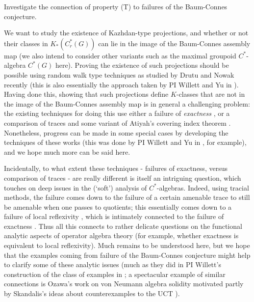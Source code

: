 \begin{project}
Investigate the connection of property (T) to failures of the Baum-Connes conjecture.
\end{project}

We want to study the existence of Kazhdan-type projections, and whether or not their classes in $K_*(C^*_r(G))$ can lie in the image of the Baum-Connes assembly map (we also intend to consider other variants such as the maximal groupoid $C^*$-algebra $C^*(G)$ here).   Proving the existence of such projections should be possible using random walk type techniques as studied by Drutu and Nowak recently \cite{Drutu:2015aa} (this is also essentially the approach taken by PI Willett and Yu in \cite{Willett:2013cr}).  Having done this, showing that such projections define $K$-classes that are not in the image of the Baum-Connes assembly map is in general a challenging problem: the existing techniques for doing this use either a failure of \emph{exactness} \cite{Higson:2002la}, or a comparison of traces and some variant of Atiyah's covering index theorem \cite{Higson:1999km}.  Nonetheless, progress can be made in some special cases by developing the techniques of these works (this was done by PI Willett and Yu in \cite{Willett:2010ud}, for example), and we hope much more can be said here.

Incidentally, to what extent these techniques - failures of exactness, versus comparison of traces - are really different is itself an intriguing question, which touches on deep issues in the (`soft') analysis of $C^*$-algebras.  Indeed, using tracial methods, the failure comes down to the failure of a certain amenable trace \cite[Chapter 6]{Brown:2008qy} to still be amenable when one passes to quotients; this essentially comes down to a failure of local reflexivity \cite[Chapter 9]{Brown:2008qy}, which is intimately connected to the failure of exactness \cite[Chapter 5]{Brown:2008qy}.  Thus all this connects to rather delicate questions on the functional analytic aspects of operator algebra theory (for example, whether exactness is equivalent to local reflexivity).  Much remains to be understood here, but we hope that the examples coming from failure of the Baum-Connes conjecture might help to clarify some of these analytic issues (much as they did in PI Willett's construction of the class of examples in \cite{Spakula:2013ys}; a spectacular example of similar connections is Ozawa's \cite{Ozawa:2004bf} work on von Neumann algebra solidity motivated partly by Skandalis's ideas about counterexamples to the UCT \cite{Skandalis:1988rr}).


